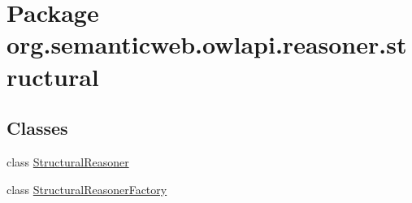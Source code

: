 \hypertarget{namespaceorg_1_1semanticweb_1_1owlapi_1_1reasoner_1_1structural}{\section{Package org.\-semanticweb.\-owlapi.\-reasoner.\-structural}
\label{namespaceorg_1_1semanticweb_1_1owlapi_1_1reasoner_1_1structural}
}
\subsection*{Classes}
\begin{DoxyCompactItemize}
\item 
class \hyperlink{classorg_1_1semanticweb_1_1owlapi_1_1reasoner_1_1structural_1_1_structural_reasoner}{Structural\-Reasoner}
\item 
class \hyperlink{classorg_1_1semanticweb_1_1owlapi_1_1reasoner_1_1structural_1_1_structural_reasoner_factory}{Structural\-Reasoner\-Factory}
\end{DoxyCompactItemize}
